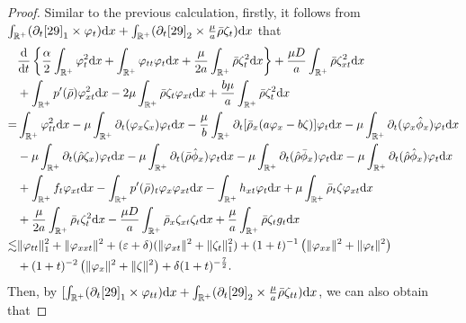\documentclass[11pt]{article}
\theoremstyle{plain}
\numberwithin{equation}{section}
\begin{document}
\begin{proof}
Similar to the previous calculation, firstly, it follows from
$\int_{\mathbb{R}^+}(\partial_t\eqref{29}_1\times \varphi_{t}){\rm d}x+\int_{\mathbb{R}^+}(\partial_t\eqref{29}_2\times\frac{\mu}{a}\bar\rho\zeta_{t}){\rm d}x$	that 
\begin{align}\label{33}
			&\frac{{\rm d}}{{\rm d}t}\left\{\frac{\alpha}{2}\int_{\mathbb{R}^+}\varphi_t^2{\rm d}x+\int_{\mathbb{R}^+}^{}\varphi_{tt}\varphi_t{\rm d}x+\frac{\mu}{2a}\int_{\mathbb{R}^+}^{}\bar\rho\zeta_t^2{\rm d}x\right\}+\frac{\mu D}{a}\int_{\mathbb{R}^+}^{}\bar\rho\zeta_{xt}^2{\rm d}x	\notag\\
			&+\int_{\mathbb{R}^+}^{}p^{\prime}(\bar\rho)\varphi_{xt}^2{\rm d}x-2\mu\int_{\mathbb{R}^+}^{}\bar\rho\zeta_t\varphi_{xt}{\rm d}x+\frac{b\mu}{a}\int_{\mathbb{R}^+}^{}\bar\rho\zeta_t^2{\rm d}x\notag\\
			=&\int_{\mathbb{R}^+}\varphi_{tt}^2{\rm d}x-\mu\int_{\mathbb{R}^+}^{}\partial_t(\varphi_{x}\zeta_x)\varphi_{t} {\rm d}x-\frac{\mu}{b}\int_{\mathbb{R}^+}^{}\partial_t[\bar\rho_x(a\varphi_{x}-b\zeta)]\varphi_{t}{\rm d}x-\mu\int_{\mathbb{R}^+}^{}\partial_t(\varphi_{x}\hat\phi_x)\varphi_{t}{\rm d}x\notag\\
			&-\mu\int_{\mathbb{R}^+}^{}\partial_t(\hat\rho\zeta_x)\varphi_{t}{\rm d}x	-\mu\int_{\mathbb{R}^+}^{}\partial_t(\bar\rho\hat\phi_x)\varphi_{t}{\rm d}x-\mu\int_{\mathbb{R}^+}^{}\partial_t(\hat\rho\bar\phi_x)\varphi_{t}{\rm d}x	-\mu\int_{\mathbb{R}^+}^{}\partial_t(\hat\rho\hat\phi_x)\varphi_{t}{\rm d}x\notag\\
			&
			+\int_{\mathbb{R}^+}^{}f_{t}\varphi_{xt}{\rm d}x-\int_{\mathbb{R}^+}^{}p^{\prime}(\bar\rho)_t\varphi_{x}\varphi_{xt}{\rm d}x
			-\int_{\mathbb{R}^+}^{}h_{xt}\varphi_{t}{\rm d}x
			+\mu\int_{\mathbb{R}^+}^{}\bar\rho_t\zeta\varphi_{xt}{\rm d}x\notag\\ 
			&+\frac{\mu}{2a}\int_{\mathbb{R}^+}^{}\bar\rho_t\zeta_t^2{\rm d}x-\frac{\mu D}{a}\int_{\mathbb{R}^+}^{}\bar\rho_x\zeta_{xt}\zeta_{t} {\rm d}x+\frac{\mu}{a}\int_{\mathbb{R}^+}^{}\bar\rho\zeta_{t}g_t {\rm d}x\notag\\
			\lesssim& \|\varphi_{tt}\|_1^2 +\|\varphi_{xxt}\|^2+(\varepsilon+\delta)(\|\varphi_{xt}\|^2+\|\zeta_{t}\|_1^2)+(1+t)^{-1}\left(\|\varphi_{xx}\|^2+\|\varphi_t\|^2\right)\notag\\ 
			&+(1+t)^{-2}\left(\|\varphi_x\|^2+\|\zeta\|^2\right)+\delta (1+t)^{-\frac{7}{2}}. 
		\end{align}
Then, 
by $[\int_{\mathbb{R}^+}(\partial_t\eqref{29}_1\times \varphi_{tt}){\rm d}x+\int_{\mathbb{R}^+}(\partial_t\eqref{29}_2\times\frac{\mu}{a}\bar\rho\zeta_{tt}){\rm d}x$, we can also obtain that

\end{proof}
\end{document}
